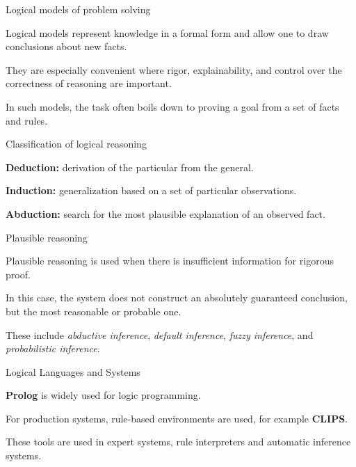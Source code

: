 \begin{frame}{Logical models of problem solving}
	\topline
	\justifying
	
	\begin{textitemize}
		\item Logical models represent knowledge in a formal form and allow one to draw conclusions about new facts.
		\item They are especially convenient where rigor, explainability, and control over the correctness of reasoning are important.
		\item In such models, the task often boils down to proving a goal from a set of facts and rules.
	\end{textitemize}
\end{frame}

\begin{frame}{Classification of logical reasoning}
	\topline
	\justifying
	
	\begin{textitemize}
		\item \textbf{Deduction:} derivation of the particular from the general.
		\item \textbf{Induction:} generalization based on a set of particular observations.
		\item \textbf{Abduction:} search for the most plausible explanation of an observed fact.
	\end{textitemize}
\end{frame}

\begin{frame}{Plausible reasoning}
	\topline
	\justifying
	
	\begin{textitemize}
		\item Plausible reasoning is used when there is insufficient information for rigorous proof.
		\item In this case, the system does not construct an absolutely guaranteed conclusion, but the most reasonable or probable one.
		\item These include \textit{abductive inference}, \textit{default inference}, \textit{fuzzy inference}, and \textit{probabilistic inference}.
	\end{textitemize}
\end{frame}

\begin{frame}{Logical Languages and Systems}
	\topline
	\justifying
	
	\begin{textitemize}
		\item \textbf{Prolog} is widely used for logic programming.
		\item For production systems, rule-based environments are used, for example \textbf{CLIPS}.
		\item These tools are used in expert systems, rule interpreters and automatic inference systems.
	\end{textitemize}
\end{frame}

